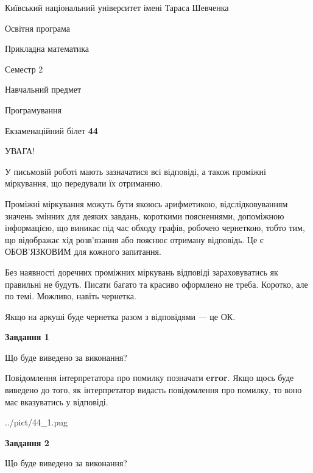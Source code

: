 \documentclass[12pt, ukrainian]{article}
\begin{document}
{{\begin {small}\par
{ \center  Київський національний університет імені Тараса Шевченка \par}
{\parbox {5 cm}{Освітня програма \hfill}{\parbox {7 cm}{Прикладна математика \hfill}}\parbox {6 cm}{\hfill Семестр 2}}\par
{\parbox {5 cm} {Навчальний предмет \hfill}\parbox {7 cm}{Програмування \hfill}\parbox {6cm}{\hfill}\par}\vspace{-7pt} \end{small}}{\center Екзаменаційний білет \No \textbf
{ 44 }\par}}
{
\begin {large}
УВАГА!

У письмовій роботі мають зазначатися всі відповіді, а також проміжні міркування, що передували їх отриманню.

Проміжні міркування можуть бути якоюсь арифметикою, відслідковуванням зна\-чень змінних для деяких завдань,
короткими поясненнями, допоміжною інформацією, що виникає під час обходу графів, робочею чернеткою,
тобто тим, що відображає хід розв’язання або пояснює отриману відповідь.
Це є ОБОВ’ЯЗКОВИМ для кожного запитання.

Без наявності доречних проміжних міркувань відповіді зараховуватись як правиль\-ні не будуть.
Писати багато та красиво оформлено не треба. Коротко, але по темі. Можли\-во, навіть чернетка.

Якщо на аркуші буде чернетка разом з відповідями --- це ОК.

\newpage

{\begin {center}\textbf{Завдання 1}\end {center}}\par
Що буде виведено за виконання?

Повідомлення інтерпретатора про помилку позначати \textbf{error}.
Якщо щось буде виведено до того, як інтерпретатор видасть повідомлення про помилку, 
то воно має вказуватись у відповіді. \par


\begin{center}
	{../pict/44_1.png}
\end{center}
\newpage

{\begin {center}\textbf{Завдання 2}\end {center}}\par
Що буде виведено за виконання?


\end{large}}
\end{document}
